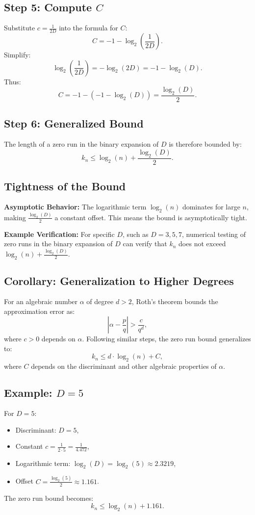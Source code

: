 \subsection*{Step 5: Compute $C$}
Substitute $c = \frac{1}{2D}$ into the formula for $C$:
\[
C = -1 - \log_2\left(\frac{1}{2D}\right).
\]
Simplify:
\[
\log_2\left(\frac{1}{2D}\right) = -\log_2(2D) = -1 - \log_2(D).
\]
Thus:
\[
C = -1 - (-1 - \log_2(D)) = \frac{\log_2(D)}{2}.
\]

\subsection*{Step 6: Generalized Bound}
The length of a zero run in the binary expansion of $D$ is therefore bounded by:
\[
k_n \leq \log_2(n) + \frac{\log_2(D)}{2}.
\]

\subsection*{Tightness of the Bound}
\textbf{Asymptotic Behavior:} The logarithmic term $\log_2(n)$ dominates for large $n$, making $\frac{\log_2(D)}{2}$ a constant offset. This means the bound is asymptotically tight.

\textbf{Example Verification:} For specific $D$, such as $D = 3, 5, 7$, numerical testing of zero runs in the binary expansion of $D$ can verify that $k_n$ does not exceed $\log_2(n) + \frac{\log_2(D)}{2}$.

\subsection*{Corollary: Generalization to Higher Degrees}
For an algebraic number $\alpha$ of degree $d > 2$, Roth’s theorem bounds the approximation error as:
\[
\left| \alpha - \frac{p}{q} \right| > \frac{c}{q^d},
\]
where $c > 0$ depends on $\alpha$. Following similar steps, the zero run bound generalizes to:
\[
k_n \leq d \cdot \log_2(n) + C,
\]
where $C$ depends on the discriminant and other algebraic properties of $\alpha$.

\subsection*{Example: $D = 5$}
For $D = 5$:
\begin{itemize}
    \item Discriminant: $D = 5$,
    \item Constant $c = \frac{1}{2 \cdot 5} = \frac{1}{4.472}$,
    \item Logarithmic term: $\log_2(D) = \log_2(5) \approx 2.3219$,
    \item Offset $C = \frac{\log_2(5)}{2} \approx 1.161$.
\end{itemize}
The zero run bound becomes:
\[
k_n \leq \log_2(n) + 1.161.
\]

